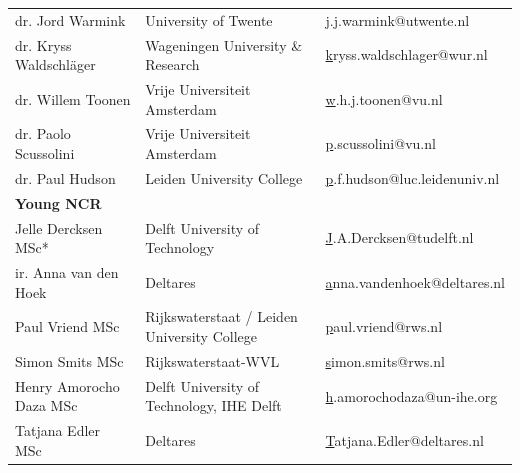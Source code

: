\begin{longtable}{@{}lll@{}}
\rowcolor[HTML]{B9C6D5} 
dr. Jord Warmink                       & University of Twente                                  & {\color[HTML]{0563C1} {\ul j.j.warmink@utwente.nl}}          \\
\rowcolor[HTML]{C9D6D6} 
dr. Kryss Waldschläger                 & Wageningen   University \& Research                   & {\color[HTML]{0563C1} {\ul kryss.waldschlager@wur.nl}}       \\
\rowcolor[HTML]{B9C6D5} 
dr. Willem Toonen                      & Vrije Universiteit   Amsterdam                        & {\color[HTML]{0563C1} {\ul w.h.j.toonen@vu.nl}}              \\
\rowcolor[HTML]{C9D6D6} 
dr. Paolo Scussolini                   & Vrije Universiteit Amsterdam                          & {\color[HTML]{0563C1} {\ul p.scussolini@vu.nl}}              \\
\rowcolor[HTML]{B9C6D5} 
dr. Paul Hudson                        & Leiden University   College                           & {\color[HTML]{0563C1} {\ul p.f.hudson@luc.leidenuniv.nl}}    \\
\rowcolor[HTML]{C9D6D6} 
\textbf{Young NCR}                     &                                                       &                                                              \\
\rowcolor[HTML]{B9C6D5} 
Jelle Dercksen MSc*                    & Delft University of   Technology                      & {\color[HTML]{0563C1} {\ul J.A.Dercksen@tudelft.nl}}         \\
\rowcolor[HTML]{C9D6D6} 
ir. Anna van den Hoek                  & Deltares                                              & {\color[HTML]{0563C1} {\ul anna.vandenhoek@deltares.nl}}     \\
\rowcolor[HTML]{B9C6D5} 
Paul Vriend MSc                        & Rijkswaterstaat /   Leiden University College         & {\color[HTML]{0563C1} {\ul paul.vriend@rws.nl}}              \\
\rowcolor[HTML]{C9D6D6} 
Simon Smits MSc                        & Rijkswaterstaat-WVL                                   & {\color[HTML]{0563C1} {\ul simon.smits@rws.nl}}              \\
\rowcolor[HTML]{B9C6D5} 
Henry Amorocho Daza MSc                & Delft University of   Technology, IHE Delft          & {\color[HTML]{0563C1} {\ul h.amorochodaza@un-ihe.org}}       \\
\rowcolor[HTML]{C9D6D6} 
Tatjana Edler MSc                      & Deltares                                              & {\color[HTML]{0563C1} {\ul Tatjana.Edler@deltares.nl}}       \\

\end{longtable}
